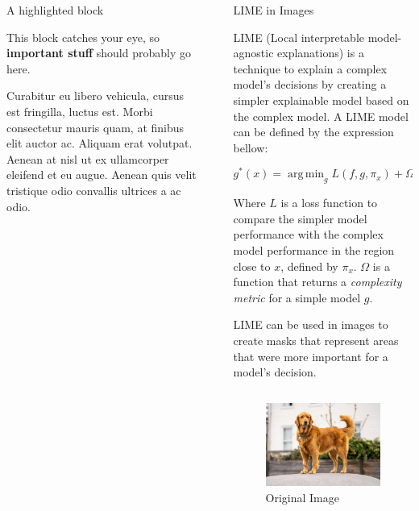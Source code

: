 \documentclass[final]{beamer}
\newlength{\sepwidth}
\newlength{\colwidth}
\newcommand{\separatorcolumn}{\begin{column}{\sepwidth}\end{column}}
\newcommand{\argmin}{\mathop{\mathrm{arg\,min}}}
\begin{document}
\begin{frame}[t]
\begin{columns}[t]
\begin{column}{\colwidth}
  \begin{alertblock}{A highlighted block}

    This block catches your eye, so \textbf{important stuff} should probably go
    here.

    Curabitur eu libero vehicula, cursus est fringilla, luctus est. Morbi
    consectetur mauris quam, at finibus elit auctor ac. Aliquam erat volutpat.
    Aenean at nisl ut ex ullamcorper eleifend et eu augue. Aenean quis velit
    tristique odio convallis ultrices a ac odio.
  \end{alertblock}

\end{column}

\separatorcolumn

\begin{column}{\colwidth}

  \begin{block}{LIME in Images}

    LIME (Local interpretable model-agnostic explanations) is a technique to explain a complex model's decisions 
    by creating a simpler explainable model based on the complex model. A LIME model can be defined by the expression bellow:
    
    \[g^*(x) = \argmin_{g} L(f, g, \pi_x) + \Omega(g)\]
    
    Where \(L\) is a loss function to compare the simpler model performance with the complex model performance in the region close to \(x\), defined by \(\pi_x\). 
    \(\Omega\) is a function that returns a \textit{complexity metric} for a simple model \(g\).

    LIME can be used in images to create masks that represent areas that were more important for a model's decision.
    
    \begin{columns}
      \begin{column}{0.5\textwidth}
        \begin{figure}
          \centering
          \includegraphics[width=0.85\linewidth]{images/dog.jpeg}
          \caption{Original Image}
        \end{figure} 
      \end{column}


\end{columns}
\end{block}
\end{column}
\end{columns}
\end{frame}
\end{document}
